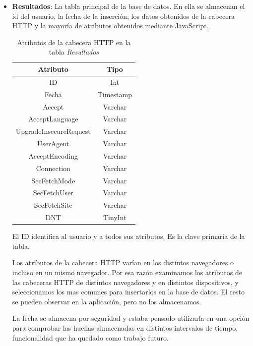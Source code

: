 \begin{itemize}
    \item \textbf{Resultados}: La tabla principal de la base de datos. En ella se almacenan el id del usuario, la fecha de la inserción, los datos obtenidos de la cabecera HTTP y la mayoría de atributos obtenidos mediante JavaScript.
    \begin{table}[tbp]
        \centering
        \begin{tabular}{c|c}
            \textbf{Atributo} & \textbf{Tipo} \\ \hline
            ID & Int \\
            Fecha & Timestamp \\
            Accept & Varchar\\
            AcceptLanguage & Varchar\\
            UpgradeInsecureRequest & Varchar\\
            UserAgent & Varchar\\
            AcceptEncoding & Varchar\\
            Connection & Varchar\\
            SecFetchMode & Varchar\\
            SecFetchUser & Varchar\\
            SecFetchSite & Varchar\\
            DNT & TinyInt\\
        \end{tabular}
        \caption{Atributos de la cabecera HTTP en la tabla \textit{Resultados}}
        \label{tab:resultadosHTTP}
    \end{table}
    El ID identifica al usuario y a todos sus atributos. Es la clave primaria de la tabla.\par
    Los atributos de la cabecera HTTP varían en los distintos navegadores o incluso en un mismo navegador. Por esa razón examinamos los atributos de las cabeceras HTTP de distintos navegadores y en distintos dispositivos, y seleccionamos los mas comunes para insertarlos en la base de datos. El resto se pueden observar en la aplicación, pero no los almacenamos.\par
    La fecha se almacena por seguridad y estaba pensado utilizarla en una opción para comprobar las huellas almacenadas en distintos intervalos de tiempo, funcionalidad que ha quedado como trabajo futuro.
    \begin{table}[tbp]
        \begin{minipage}[c]{85mm}
        \centering

\end{minipage}
\end{table}
\end{itemize}
